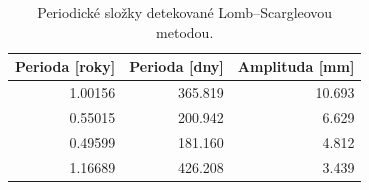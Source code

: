 \begin{table}[H]
\centering
\small
\caption{Periodické složky detekované Lomb--Scargleovou metodou.}
\label{tab:lomb_significant_peaks}
\begin{tabular}{rrr}
\toprule
Perioda [roky] & Perioda [dny] & Amplituda [mm] \\
\midrule
1.00156 & 365.819 & 10.693 \\
0.55015 & 200.942 & 6.629 \\
0.49599 & 181.160 & 4.812 \\
1.16689 & 426.208 & 3.439 \\
\bottomrule
\end{tabular}
\end{table}
